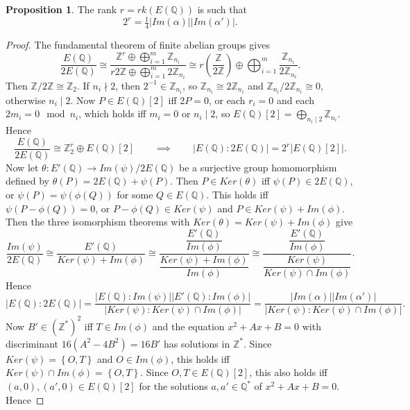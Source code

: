 \documentclass{article}
\newcommand{\Z}{\mathbb{Z}}
\newcommand{\Q}{\mathbb{Q}}
\newcommand{\rb}[1]{\left( #1 \right)}
\renewcommand{\sb}[1]{\left[ #1 \right]}
\newcommand{\cb}[1]{\left\{ #1 \right\}}
\newcommand{\abs}[1]{\left\lvert #1 \right\rvert}
\theoremstyle{definition}\newtheorem*{definition}{Definition}
\theoremstyle{definition}\newtheorem*{example}{Example}
\theoremstyle{definition}\newtheorem*{remark}{Remark}
\newtheorem{proposition}{Proposition}[subsection]
\begin{document}
\begin{proposition}
The rank $ r = rk\rb{E\rb{\Q}} $ is such that
$$ 2^r = \tfrac{1}{4}\abs{Im\rb{\alpha}}\abs{Im\rb{\alpha'}}. $$
\end{proposition}

\begin{proof}
The fundamental theorem of finite abelian groups gives
$$ \dfrac{E\rb{\Q}}{2E\rb{\Q}} \cong \dfrac{\Z^r \oplus \bigoplus_{i = 1}^m \Z_{n_i}}{r2\Z \oplus \bigoplus_{i = 1}^m 2\Z_{n_i}} \cong r\rb{\dfrac{\Z}{2\Z}} \oplus \bigoplus_{i = 1}^m \dfrac{\Z_{n_i}}{2\Z_{n_i}}. $$
Then $ \Z / 2\Z \cong \Z_2 $. If $ n_i \nmid 2 $, then $ 2^{-1} \in \Z_{n_i} $, so $ \Z_{n_i} \cong 2\Z_{n_i} $ and $ \Z_{n_i} / 2\Z_{n_i} \cong 0 $, otherwise $ n_i \mid 2 $. Now $ P \in E\rb{\Q}\sb{2} $ iff $ 2P = 0 $, or each $ r_i = 0 $ and each $ 2m_i = 0 \mod n_i $, which holds iff $ m_i = 0 $ or $ n_i \mid 2 $, so $ E\rb{\Q}\sb{2} = \bigoplus_{n_i \mid 2} \Z_{n_i} $. Hence
$$ \dfrac{E\rb{\Q}}{2E\rb{\Q}} \cong \Z^r_2 \oplus E\rb{\Q}\sb{2} \qquad \implies \qquad \abs{E\rb{\Q} : 2E\rb{\Q}} = 2^r\abs{E\rb{\Q}\sb{2}}. $$
Now let $ \theta : E'\rb{\Q} \to Im\rb{\psi} / 2E\rb{\Q} $ be a surjective group homomorphism defined by $ \theta\rb{P} = 2E\rb{\Q} + \psi\rb{P} $. Then $ P \in Ker\rb{\theta} $ iff $ \psi\rb{P} \in 2E\rb{\Q} $, or $ \psi\rb{P} = \psi\rb{\phi\rb{Q}} $ for some $ Q \in E\rb{\Q} $. This holds iff $ \psi\rb{P - \phi\rb{Q}} = 0 $, or $ P - \phi\rb{Q} \in Ker\rb{\psi} $ and $ P \in Ker\rb{\psi} + Im\rb{\phi} $. Then the three isomorphism theorems with $ Ker\rb{\theta} = Ker\rb{\psi} + Im\rb{\phi} $ give
$$ \dfrac{Im\rb{\psi}}{2E\rb{\Q}} \cong \dfrac{E'\rb{\Q}}{Ker\rb{\psi} + Im\rb{\phi}} \cong \dfrac{\dfrac{E'\rb{\Q}}{Im\rb{\phi}}}{\dfrac{Ker\rb{\psi} + Im\rb{\phi}}{Im\rb{\phi}}} \cong \dfrac{\dfrac{E'\rb{\Q}}{Im\rb{\phi}}}{\dfrac{Ker\rb{\psi}}{Ker\rb{\psi} \cap Im\rb{\phi}}}. $$
Hence
$$ \abs{E\rb{\Q} : 2E\rb{\Q}} = \dfrac{\abs{E\rb{\Q} : Im\rb{\psi}}\abs{E'\rb{\Q} : Im\rb{\phi}}}{\abs{Ker\rb{\psi} : Ker\rb{\psi} \cap Im\rb{\phi}}} = \dfrac{\abs{Im\rb{\alpha}}\abs{Im\rb{\alpha'}}}{\abs{Ker\rb{\psi} : Ker\rb{\psi} \cap Im\rb{\phi}}}. $$
Now $ B' \in \rb{\Z^*}^2 $ iff $ T \in Im\rb{\phi} $ and the equation $ x^2 + Ax + B = 0 $ with discriminant $ 16\rb{A^2 - 4B^2} = 16B' $ has solutions in $ \Z^* $. Since $ Ker\rb{\psi} = \cb{O, T} $ and $ O \in Im\rb{\phi} $, this holds iff $ Ker\rb{\psi} \cap Im\rb{\phi} = \cb{O, T} $. Since $ O, T \in E\rb{\Q}\sb{2} $, this also holds iff $ \rb{a, 0}, \rb{a', 0} \in E\rb{\Q}\sb{2} $ for the solutions $ a, a' \in \Q^* $ of $ x^2 + Ax + B = 0 $. Hence

\end{proof}
\end{document}

